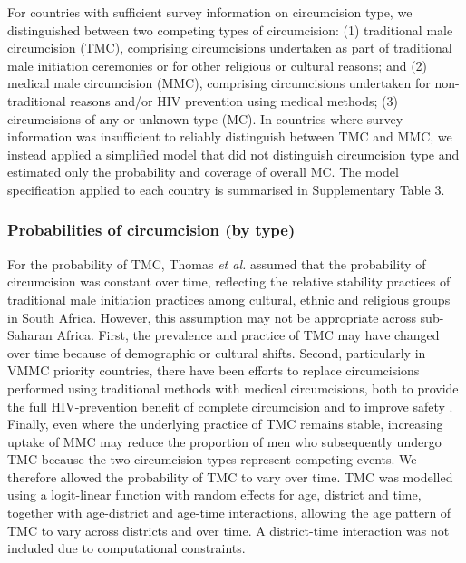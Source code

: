 \documentclass{article}
\begin{document}
For countries with sufficient survey information on circumcision type, we distinguished between two competing types of circumcision: (1) traditional male circumcision (TMC), comprising circumcisions undertaken as part of traditional male initiation ceremonies or for other religious or cultural reasons; and (2) medical male circumcision (MMC), comprising circumcisions undertaken for non-traditional reasons and/or HIV prevention using medical methods; (3) circumcisions of any or unknown type (MC). In countries where survey information was insufficient to reliably distinguish between TMC and MMC, we instead applied a simplified model that did not distinguish circumcision type and estimated only the probability and coverage of overall MC. The model specification applied to each country is summarised in Supplementary Table 3.


\subsubsection*{Probabilities of circumcision (by type)}
\label{sec::bytype}

 
For the probability of TMC, Thomas {\it et al.} \cite{thomas2024substantial} assumed that the probability of circumcision was constant over time, reflecting the relative stability practices of traditional male initiation practices among cultural, ethnic and religious groups in South Africa. However, this assumption may not be appropriate across sub-Saharan Africa. First, the prevalence and practice of TMC may have changed over time because of demographic or cultural shifts. Second, particularly in VMMC priority countries, there have been efforts to replace circumcisions performed using traditional methods with medical circumcisions, both to provide the full HIV-prevention benefit of complete circumcision and to improve safety \cite{thomas2024substantial}. Finally, even where the underlying practice of TMC remains stable, increasing uptake of MMC may reduce the proportion of men who subsequently undergo TMC because the two circumcision types represent competing events. We therefore allowed the probability of TMC to vary over time. TMC was modelled using a logit-linear function with random effects for age, district and time, together with age-district and age-time interactions, allowing the age pattern of TMC to vary across districts and over time. A district-time interaction was not included due to computational constraints.
\end{document}
